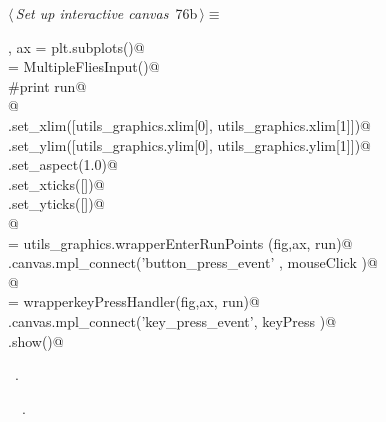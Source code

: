 \documentclass[11.5pt]{report}
\begin{document}
\vspace{-0.8cm}\newchunk 
\begin{flushleft} \small\label{scrap108}\raggedright\small
{} $\langle\,${\itshape Set up interactive canvas}\nobreak\ {\footnotesize {76b}}$\,\rangle\equiv$
\vspace{-1ex}
\begin{list}{}{} \item
\mbox{}\verb@fig, ax =  plt.subplots()@\\
\mbox{}\verb@run = MultipleFliesInput()@\\
\mbox{}\verb@#print run@\\
\mbox{}\verb@    @\\
\mbox{}\verb@ax.set_xlim([utils_graphics.xlim[0], utils_graphics.xlim[1]])@\\
\mbox{}\verb@ax.set_ylim([utils_graphics.ylim[0], utils_graphics.ylim[1]])@\\
\mbox{}\verb@ax.set_aspect(1.0)@\\
\mbox{}\verb@ax.set_xticks([])@\\
\mbox{}\verb@ax.set_yticks([])@\\
\mbox{}\verb@      @\\
\mbox{}\verb@mouseClick   = utils_graphics.wrapperEnterRunPoints (fig,ax, run)@\\
\mbox{}\verb@fig.canvas.mpl_connect('button_press_event' , mouseClick )@\\
\mbox{}\verb@      @\\
\mbox{}\verb@keyPress     = wrapperkeyPressHandler(fig,ax, run)@\\
\mbox{}\verb@fig.canvas.mpl_connect('key_press_event', keyPress   )@\\
\mbox{}\verb@plt.show()@\\
\mbox{}\verb@@{\NWsep}
\end{list}
\vspace{-1.5ex}
\footnotesize
\begin{list}{}{\setlength{\itemsep}{-\parsep}\setlength{\itemindent}{-\leftmargin}}
\item \NWtxtMacroRefIn\ .
\item \NWtxtIdentsUsed\nobreak\  \verb@wrapperkeyPressHandler@\nobreak\ .
\item{}
\end{list}
\vspace{4ex}
\end{flushleft}
\end{document}
